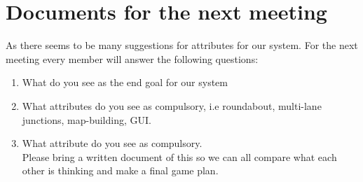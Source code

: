 \documentclass{article}
\begin{document}
	\section*{Documents for the next meeting}
	As there seems to be many suggestions for attributes for our system. 
	For the next meeting every member will answer the following questions:
	
	\begin{enumerate}
		\item What do you see as the end goal for our system 
		\item What attributes do you see as compulsory, i.e roundabout, multi-lane junctions, map-building, GUI.
		\item What attribute do you see as compulsory.\\
		
		Please bring a written document of this so we can all compare what each other is thinking and make a final game plan.  
	\end{enumerate}
	
	
		
	
\end{document}
